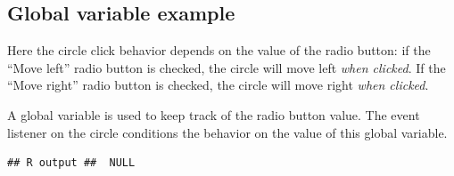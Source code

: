 \documentclass[
  openany]{book}
\begin{document}
\hypertarget{global-variable-example}{%
\subsection{Global variable example}\label{global-variable-example}}

Here the circle click behavior depends on the value of the radio button: if the ``Move left'' radio button is checked, the circle will move left \emph{when clicked}. If the ``Move right'' radio button is checked, the circle will move right \emph{when clicked}.

A global variable is used to keep track of the radio button value. The event listener on the circle conditions the behavior on the value of this global variable.

\begin{verbatim}
## R output ##  NULL
\end{verbatim}
\end{document}
